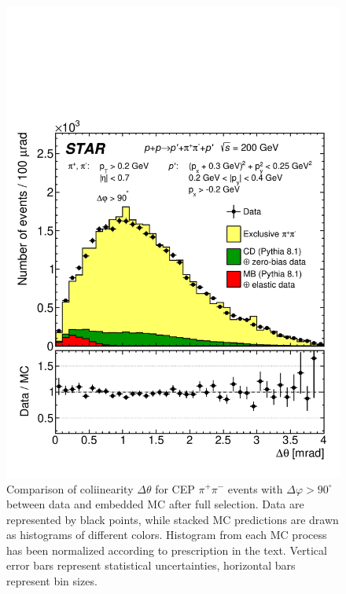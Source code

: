 \begin{figure}[ht!]
\centering%
\parbox{0.4725\textwidth}{%
  \centering%
  \includegraphics[width=\linewidth]{graphics/backgrounds/dataVsMc/Ratio_Collinearity.pdf}
}%
\quad%
\parbox{0.4725\textwidth}{%
    \caption[Comparison of collinearity $\Delta\theta$ for CEP $\pi^{+}\pi^{-}$ events with $\Delta\varphi>90^{\circ}$, between data and embedded MC.]{Comparison of coliinearity $\Delta\theta$ for CEP $\pi^{+}\pi^{-}$ events with $\Delta\varphi>90^{\circ}$ between data and embedded MC after full selection. Data are represented by black points, while stacked MC predictions are drawn as histograms of different colors. Histogram from each MC process has been normalized according to prescription in the text. Vertical error bars represent statistical uncertainties, horizontal bars represent bin sizes.}\label{fig:Ratio_Collinearity}%
}
\end{figure}






